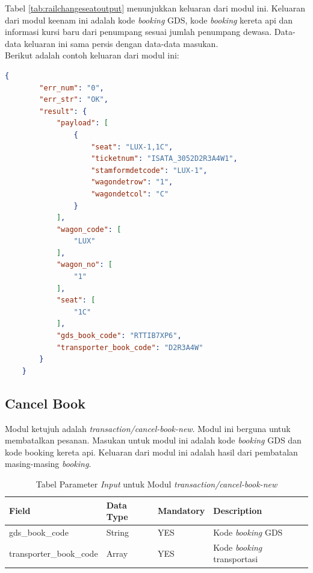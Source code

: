 Tabel \ref{tab:railchangeseatoutput} menunjukkan keluaran dari modul ini. Keluaran dari modul keenam ini adalah kode \textit{booking} GDS, kode \textit{booking} kereta api dan informasi kursi baru dari penumpang sesuai jumlah penumpang dewasa. Data-data keluaran ini sama persis dengan data-data masukan.\\

Berikut adalah contoh keluaran dari modul ini:

\begin{lstlisting}[language=json]
    {
        "err_num": "0",
        "err_str": "OK",
        "result": {
            "payload": [
                {
                    "seat": "LUX-1,1C",
                    "ticketnum": "ISATA_3052D2R3A4W1",
                    "stamformdetcode": "LUX-1",
                    "wagondetrow": "1",
                    "wagondetcol": "C"
                }
            ],
            "wagon_code": [
                "LUX"
            ],
            "wagon_no": [
                "1"
            ],
            "seat": [
                "1C"
            ],
            "gds_book_code": "RTTIB7XP6",
            "transporter_book_code": "D2R3A4W"
        }
    }
\end{lstlisting}

\subsection{Cancel Book}
\label{subsec:cancelbook}

Modul ketujuh adalah \textit{transaction/cancel-book-new}. Modul ini berguna untuk membatalkan pesanan. Masukan untuk modul ini adalah kode \textit{booking} GDS dan kode booking kereta api. 
Keluaran dari modul ini adalah hasil dari pembatalan masing-masing \textit{booking}.

\begin{table}[H]
	\centering 
	\caption{Tabel Parameter \textit{Input} untuk Modul \textit{transaction/cancel-book-new}}
	\label{tab:cancelbookinput}
	\begin{tabular}{|l|l|l|l|}
		\hline
		Field & Data Type & Mandatory & Description\\
		\hline
		
		\hline
        gds\_book\_code & String & YES & Kode \textit{booking} GDS\\
        \hline
        transporter\_book\_code & Array & YES & Kode \textit{booking} transportasi\\
        \hline
        
	\end{tabular} 
\end{table}

